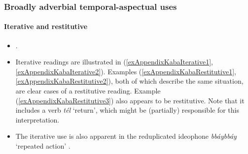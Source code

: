 \subsubsection{Broadly adverbial temporal-aspectual uses}
\paragraph{Iterative and restitutive}
\label{appendixKabaIterative}
\begin{itemize}
	\item \textcite[426]{Moser2004}.
	\item Iterative readings are illustrated in (\ref{exAppendixKabaIterative1}, \ref{exAppendixKabaIterative2}). Examples (\ref{exAppendixKabaRestitutive1}, \ref{exAppendixKabaRestitutive2}), both of which describe the same situation, are clear cases of a restitutive reading. Example (\ref{exAppendixKabaRestitutive3}) also appears to be restitutive. Note that it includes a verb \textit{tél} \lq return', which might be (partially) responsible for this interpretation.
	\item The iterative use is also apparent in the reduplicated ideophone \textit{bbáybbáy} \lq repeated action\rq{ }\parencite[10, 314, 357]{MoserDingatoloum2007}.
\end{itemize}

